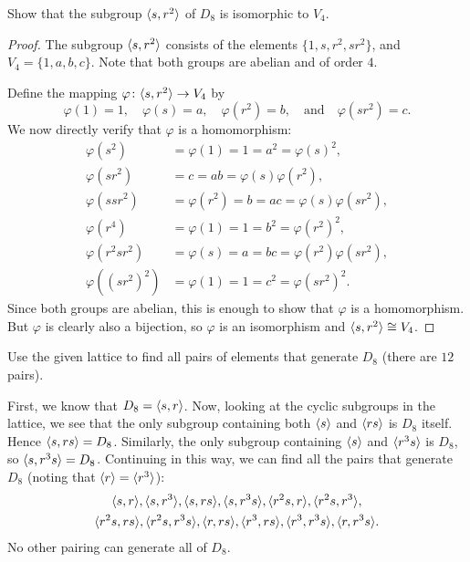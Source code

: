  Show that the subgroup $\langle{s, r^2}\rangle$ of $D_8$ is
isomorphic to $V_4$.
\begin{proof}
  The subgroup $\langle{s, r^2}\rangle$ consists of the elements
  $\{1, s, r^2, sr^2\}$, and $V_4 = \{1, a, b, c\}$. Note that both
  groups are abelian and of order $4$.

  Define the mapping $\varphi\colon\langle{s,r^2}\rangle\to V_4$ by
  \begin{equation*}
    \varphi(1) = 1,
    \quad
    \varphi(s) = a,
    \quad
    \varphi(r^2) = b,
    \quad\text{and}\quad
    \varphi(sr^2) = c.
  \end{equation*}
  We now directly verify that $\varphi$ is a homomorphism:
  \begin{align*}
    \varphi(s^2) &= \varphi(1) = 1 = a^2 = \varphi(s)^2, \\
    \varphi(sr^2) &= c = ab = \varphi(s)\varphi(r^2), \\
    \varphi(ssr^2) &= \varphi(r^2) = b = ac = \varphi(s)\varphi(sr^2), \\
    \varphi(r^4) &= \varphi(1) = 1 = b^2 = \varphi(r^2)^2, \\
    \varphi(r^2sr^2) &= \varphi(s) = a = bc = \varphi(r^2)\varphi(sr^2), \\
    \varphi((sr^2)^2) &= \varphi(1) = 1 = c^2 = \varphi(sr^2)^2.
  \end{align*}
  Since both groups are abelian, this is enough to show that $\varphi$
  is a homomorphism. But $\varphi$ is clearly also a bijection, so
  $\varphi$ is an isomorphism and $\langle{s,r^2}\rangle\cong V_4$.
\end{proof}

 Use the given lattice to find all pairs of elements that
generate $D_8$ (there are $12$ pairs).
\begin{solution}
  First, we know that $D_8 = \langle{s,r}\rangle$. Now, looking at the cyclic
  subgroups in the lattice, we see that the only subgroup containing
  both $\langle{s}\rangle$ and $\langle{rs}\rangle$ is $D_8$ itself. Hence
  $\langle{s, rs}\rangle = D_8$. Similarly, the only subgroup containing
  $\langle{s}\rangle$ and $\langle{r^3s}\rangle$ is $D_8$, so $\langle{s, r^3s}\rangle =
  D_8$. Continuing in this way, we can find all the pairs that
  generate $D_8$ (noting that $\langle{r}\rangle = \langle{r^3}\rangle$):
  \begin{multline*}
    \langle{s,r}\rangle, \langle{s,r^3}\rangle, \langle{s,rs}\rangle, \langle{s,r^3s}\rangle,
    \langle{r^2s,r}\rangle, \langle{r^2s,r^3}\rangle, \\
    \langle{r^2s,rs}\rangle, \langle{r^2s,r^3s}\rangle,
    \langle{r,rs}\rangle, \langle{r^3,rs}\rangle, \langle{r^3,r^3s}\rangle, \langle{r,r^3s}\rangle.
  \end{multline*}
  No other pairing can generate all of $D_8$.
\end{solution}

